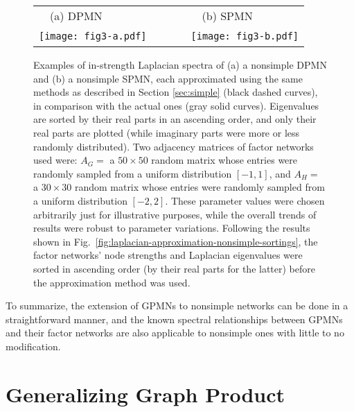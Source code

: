 \documentclass{article}
\begin{document}
\begin{figure}[t]
\centering
\begin{tabular}{lcl}
~~(a) DPMN & ~~~~ & ~~(b) SPMN \\
\texttt{[image: fig3-a.pdf]} & ~~~~ &
\texttt{[image: fig3-b.pdf]} \\
\end{tabular}
\caption{Examples of in-strength Laplacian spectra of (a) a nonsimple
  DPMN and (b) a nonsimple SPMN, each approximated using the same
  methods as described in Section \ref{sec:simple}
  \cite{sayama2016estimation} (black dashed curves), in comparison
  with the actual ones (gray solid curves). Eigenvalues are sorted by
  their real parts in an ascending order, and only their real parts
  are plotted (while imaginary parts were more or less randomly
  distributed). Two adjacency matrices of factor networks used were:
  $A_G=$ a $50 \times 50$ random matrix whose entries were randomly
  sampled from a uniform distribution $[-1,1]$, and $A_H=$ a $30
  \times 30$ random matrix whose entries were randomly sampled from a
  uniform distribution $[-2,2]$. These parameter values were chosen
  arbitrarily just for illustrative purposes, while the overall trends
  of results were robust to parameter variations. Following the
  results shown in
  Fig.~\ref{fig:laplacian-approximation-nonsimple-sortings}, the
  factor networks' node strengths and Laplacian eigenvalues were
  sorted in ascending order (by their real parts for the latter)
  before the approximation method was used.}
\label{fig:laplacian-approximation-nonsimple}
\end{figure}

To summarize, the extension of GPMNs to nonsimple networks can be done
in a straightforward manner, and the known spectral relationships
between GPMNs and their factor networks are also applicable to
nonsimple ones with little to no modification.

\section{Generalizing Graph Product}
\label{sec:generalized-gp}
\end{document}
